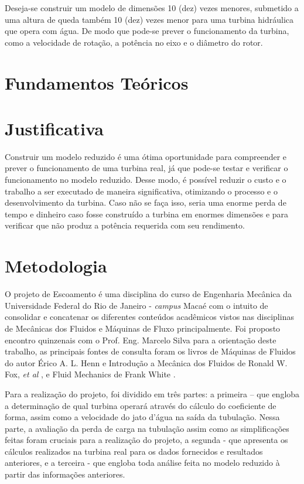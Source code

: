 \documentclass[a4paper, 12pt, openany, oneside, brazil]{abntex2} %
\begin{document}
    Deseja-se construir um modelo de dimensões 10 (dez) vezes menores, submetido a uma altura de queda também 10 (dez) vezes menor para uma turbina hidráulica que opera com água. De modo que pode-se prever o funcionamento da turbina, como a velocidade de rotação, a potência no eixo e o diâmetro do rotor.


\chapter{Fundamentos Teóricos}
% 
% 



\chapter{Justificativa}
    Construir um modelo reduzido é uma ótima oportunidade para compreender e prever o funcionamento de uma turbina real, já que pode-se testar e verificar o funcionamento no modelo reduzido. Desse modo, é possível reduzir o custo e o trabalho a ser executado de maneira significativa, otimizando o processo e o desenvolvimento da turbina. Caso não se faça isso, seria uma enorme perda de tempo e dinheiro caso fosse construído a turbina em enormes dimensões e para verificar que não produz a potência requerida com seu rendimento.

\chapter{Metodologia} %

    O projeto de Escoamento é uma disciplina do curso de Engenharia Mecânica da Universidade Federal do Rio de Janeiro - \textit{campus} Macaé com o intuito de consolidar e concatenar os diferentes conteúdos acadêmicos vistos nas disciplinas de Mecânicas dos Fluidos e Máquinas de Fluxo principalmente. Foi proposto encontro quinzenais com o Prof. Eng. Marcelo Silva para a orientação deste trabalho, as principais fontes de consulta foram os livros de Máquinas de Fluidos do autor Érico A. L. Henn \cite{maq_fluidos_henn} e Introdução a Mecânica dos Fluidos de Ronald W. Fox,  \textit{et al} \cite{fox}, e Fluid Mechanics de Frank White \cite{white}.

    Para a realização do projeto, foi dividido em três partes: a primeira – que engloba a determinação de qual turbina operará através do cálculo do coeficiente de forma, assim como a velocidade do jato d'água na saída da tubulação. Nessa parte, a avaliação da perda de carga na tubulação assim como as simplificações feitas foram cruciais para a realização do projeto, a segunda - que apresenta os cálculos realizados na turbina real para os dados fornecidos e resultados anteriores, e a terceira - que engloba toda análise feita no modelo reduzido à partir das informações anteriores.
\end{document}
